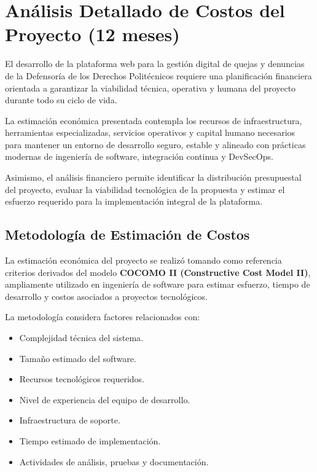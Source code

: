 \documentclass[12pt,oneside,letterpaper]{book}
\begin{document}
\section{Análisis Detallado de Costos del Proyecto (12 meses)}

El desarrollo de la plataforma web para la gestión digital de quejas y denuncias de la Defensoría de los Derechos Politécnicos requiere una planificación financiera orientada a garantizar la viabilidad técnica, operativa y humana del proyecto durante todo su ciclo de vida.

La estimación económica presentada contempla los recursos de infraestructura, herramientas especializadas, servicios operativos y capital humano necesarios para mantener un entorno de desarrollo seguro, estable y alineado con prácticas modernas de ingeniería de software, integración continua y DevSecOps.

Asimismo, el análisis financiero permite identificar la distribución presupuestal del proyecto, evaluar la viabilidad tecnológica de la propuesta y estimar el esfuerzo requerido para la implementación integral de la plataforma.

\vspace{0.5cm}

\subsection{Metodología de Estimación de Costos}

La estimación económica del proyecto se realizó tomando como referencia criterios derivados del modelo \textbf{COCOMO II (Constructive Cost Model II)}, ampliamente utilizado en ingeniería de software para estimar esfuerzo, tiempo de desarrollo y costos asociados a proyectos tecnológicos.

La metodología considera factores relacionados con:

\begin{itemize}
    \item Complejidad técnica del sistema.
    \item Tamaño estimado del software.
    \item Recursos tecnológicos requeridos.
    \item Nivel de experiencia del equipo de desarrollo.
    \item Infraestructura de soporte.
    \item Tiempo estimado de implementación.
    \item Actividades de análisis, pruebas y documentación.
\end{itemize}
\end{document}
